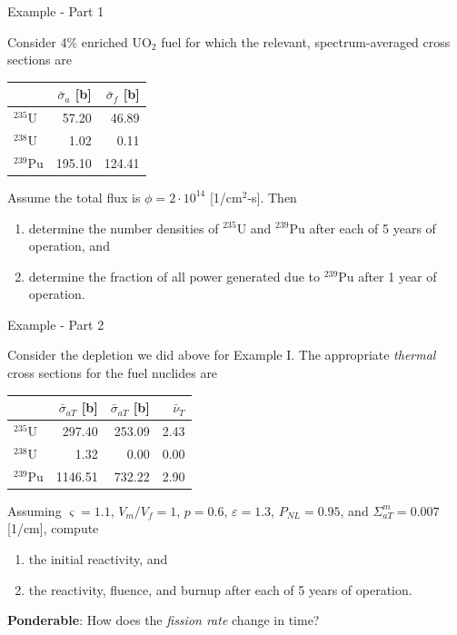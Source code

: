 \documentclass[aspectratio=1610]{beamer}
\begin{document}
\begin{frame}[fragile]{Example - Part 1}
 
 
Consider 4\% enriched UO$_2$ fuel for which the relevant, spectrum-averaged cross sections are

\begin{table}[h!]
\centering
\begin{tabular}{lrr}
\toprule
 & $\bar{\sigma}_a$ [b] & $\bar{\sigma}_f$ [b] \\
\midrule
${}^{235}$U   &  57.20  &  46.89 \\
${}^{238}$U   &   1.02  &   0.11 \\
${}^{239}$Pu  & 195.10  & 124.41 \\
\bottomrule
\end{tabular}
\end{table}

Assume the total flux is $\phi = 2\cdot 10^{14}$ [1/cm$^2$-s].  Then
\begin{enumerate}
 \item determine the number densities of ${}^{235}$U and ${}^{239}$Pu after each of 5 years of operation, and
 \item determine the fraction of all power generated due to ${}^{239}$Pu after 1 year of operation.
\end{enumerate}


 
\end{frame}


\begin{frame}[fragile]{Example - Part 2}
 
Consider the depletion we did above for Example I.  The appropriate {\it thermal} cross sections for the fuel nuclides are

\begin{table}[h!]
\centering
\begin{tabular}{lrrr}
\toprule
 & $\bar{\sigma}_{aT}$ [b] & $\bar{\sigma}_{aT}$ [b]  & $\bar{\nu}_{T}$   \\
\midrule
${}^{235}$U   &  297.40   & 253.09  & 2.43 \\
${}^{238}$U   &    1.32   &   0.00  & 0.00 \\
${}^{239}$Pu  & 1146.51   & 732.22  & 2.90 \\
\bottomrule
\end{tabular}
\end{table}

Assuming  $\varsigma = 1.1$, $V_m/V_f = 1$, $p=0.6$, $\varepsilon=1.3$, $P_{NL}=0.95$, and $\Sigma^m_{aT} = 0.007$ [1/cm], compute 
\begin{enumerate}
 \item the initial reactivity, and
 \item the reactivity, fluence, and burnup after each of 5 years of operation.
\end{enumerate}


\vfill

{\bf Ponderable}: How does the {\it fission rate} change in time?
\end{frame}
\end{document}
